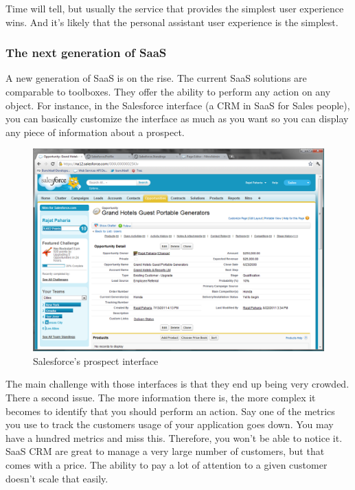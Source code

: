 \documentclass[12pt]{article}
\begin{document}
Time will tell, but usually the service that provides the simplest user
experience wins. And it's likely that the personal assistant user experience is
the simplest.


\subsubsection{The next generation of SaaS}

A new generation of SaaS is on the rise. The current SaaS solutions are
comparable to toolboxes. They offer the ability to perform any action on any
object. For instance, in the Salesforce interface (a CRM in SaaS for Sales
people), you can basically customize the interface as much as you want so you
can display any piece of information about a prospect.


\smallskip

\begin{figure}[ht]
    \centering
    \includegraphics[width=\textwidth]{salesforce}
    \caption{Salesforce's prospect interface}
    \label{fig:salesforce}
\end{figure}

\smallskip

The main challenge with those interfaces is that they end up being very crowded.
There a second issue. The more information there is, the more complex it becomes
to identify that you should perform an action. Say one of the metrics you use to
track the customers usage of your application goes down. You may have a hundred
metrics and miss this. Therefore, you won't be able to notice it. SaaS CRM are
great to manage a very large number of customers, but that comes with a price.
The ability to pay a lot of attention to a given customer doesn't scale that
easily.
\end{document}
